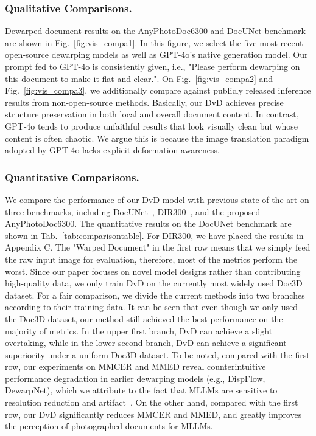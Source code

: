 \subsubsection{Qualitative Comparisons.} Dewarped document results on the AnyPhotoDoc6300 and DocUNet benchmark are shown in Fig.~\ref{fig:vis_compa1}. 
In this figure, we select the five most recent open‑source dewarping models as well as GPT‑4o’s native generation model. Our prompt fed to GPT-4o is consistently given, i.e., "Please perform dewarping on this document to make it flat and clear.". On Fig.~\ref{fig:vis_compa2} and Fig.~\ref{fig:vis_compa3}, we additionally compare against publicly released inference results from non‑open‑source methods. Basically, our DvD achieves precise structure preservation in both local and overall document content. In contrast, GPT‑4o tends to produce unfaithful results that look visually clean but whose content is often chaotic. We argue this is because the image translation paradigm adopted by GPT-4o lacks explicit deformation awareness.

\subsubsection{Quantitative Comparisons.}
We compare the performance of our DvD model with previous state-of-the-art on three benchmarks, including DocUNet~\cite{ma2018docunet}, DIR300~\cite{Feng2022geodocnet}, and the proposed AnyPhotoDoc6300. 
The quantitative results on the DocUNet benchmark are shown in Tab.~\ref{tab:comparisontable}. For DIR300, we have placed the results in Appendix C. The "Warped Document" in the first row means that we simply feed the raw input image for evaluation, therefore, most of the metrics perform the worst.
Since our paper focuses on novel model designs rather than contributing high-quality data, we only train DvD on the currently most widely used Doc3D~\cite{das2019dewarpnet} dataset. For a fair comparison, we divide the current methods into two branches according to their training data. It can be seen that even though we only used the Doc3D dataset, our method still achieved the best performance on the majority of metrics.
In the upper first branch, DvD can achieve a slight overtaking, while in the lower second branch, DvD can achieve a significant superiority under a uniform Doc3D dataset. To be noted, compared with the first row, our experiments on MMCER and MMED reveal counterintuitive performance degradation in earlier dewarping models (e.g., DispFlow, DewarpNet), which we attribute to the fact that MLLMs are sensitive to resolution reduction and artifact~\cite{Li_2024_CVPR, feng_docpedia_2024}. On the other hand, compared with the first row, our DvD significantly reduces MMCER and MMED, and greatly improves the perception of photographed documents for MLLMs.


